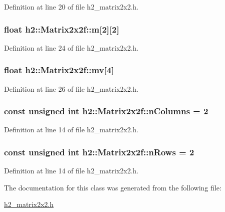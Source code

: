 Definition at line 20 of file h2\-\_\-matrix2x2.\-h.

\hypertarget{classh2_1_1_matrix2x2f_acb3cfb4eb97068e8b5f810cd49838e87}{
\subsubsection[{m}]{\setlength{\rightskip}{0pt plus 5cm}float h2\-::\-Matrix2x2f\-::m\mbox{[}2\mbox{]}\mbox{[}2\mbox{]}}}\label{classh2_1_1_matrix2x2f_acb3cfb4eb97068e8b5f810cd49838e87}


Definition at line 24 of file h2\-\_\-matrix2x2.\-h.

\hypertarget{classh2_1_1_matrix2x2f_abcbe12870c7e883f72d7cbd8afc38572}{
\subsubsection[{mv}]{\setlength{\rightskip}{0pt plus 5cm}float h2\-::\-Matrix2x2f\-::mv\mbox{[}4\mbox{]}}}\label{classh2_1_1_matrix2x2f_abcbe12870c7e883f72d7cbd8afc38572}


Definition at line 26 of file h2\-\_\-matrix2x2.\-h.

\hypertarget{classh2_1_1_matrix2x2f_a076bbf7661df8f6cf0b073c5b44bcc4c}{
\subsubsection[{n\-Columns}]{\setlength{\rightskip}{0pt plus 5cm}const unsigned int h2\-::\-Matrix2x2f\-::n\-Columns = 2\hspace{0.3cm}{\ttfamily [static]}}}\label{classh2_1_1_matrix2x2f_a076bbf7661df8f6cf0b073c5b44bcc4c}


Definition at line 14 of file h2\-\_\-matrix2x2.\-h.

\hypertarget{classh2_1_1_matrix2x2f_a5ab9bea382b523eb7568c77132de01ed}{
\subsubsection[{n\-Rows}]{\setlength{\rightskip}{0pt plus 5cm}const unsigned int h2\-::\-Matrix2x2f\-::n\-Rows = 2\hspace{0.3cm}{\ttfamily [static]}}}\label{classh2_1_1_matrix2x2f_a5ab9bea382b523eb7568c77132de01ed}


Definition at line 14 of file h2\-\_\-matrix2x2.\-h.



The documentation for this class was generated from the following file\-:\begin{DoxyCompactItemize}
\item 
\hyperlink{h2__matrix2x2_8h}{h2\-\_\-matrix2x2.\-h}\end{DoxyCompactItemize}
